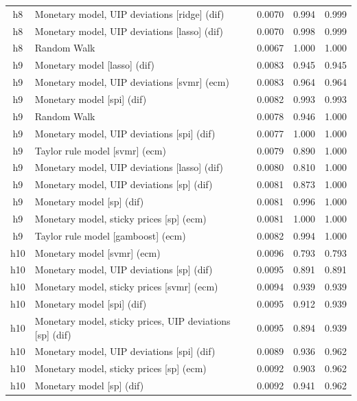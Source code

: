 \begin{ThreePartTable}
\begin{longtable}[t]{cp{5.5cm}ccc}
h8 & \raggedright Monetary model, UIP deviations [ridge] (dif) & 0.0070 & 0.994 & 0.999\\
h8 & \raggedright Monetary model, UIP deviations [lasso] (dif) & 0.0070 & 0.998 & 0.999\\
h8 & \raggedright Random Walk & 0.0067 & 1.000 & 1.000\\
\addlinespace
h9 & \raggedright Monetary model [lasso] (dif) & 0.0083 & 0.945 & 0.945\\
h9 & \raggedright Monetary model, UIP deviations [svmr] (ecm) & 0.0083 & 0.964 & 0.964\\
h9 & \raggedright Monetary model [spi] (dif) & 0.0082 & 0.993 & 0.993\\
h9 & \raggedright Random Walk & 0.0078 & 0.946 & 1.000\\
h9 & \raggedright Monetary model, UIP deviations [spi] (dif) & 0.0077 & 1.000 & 1.000\\
h9 & \raggedright Taylor rule model [svmr] (ecm) & 0.0079 & 0.890 & 1.000\\
h9 & \raggedright Monetary model, UIP deviations [lasso] (dif) & 0.0080 & 0.810 & 1.000\\
h9 & \raggedright Monetary model, UIP deviations [sp] (dif) & 0.0081 & 0.873 & 1.000\\
h9 & \raggedright Monetary model [sp] (dif) & 0.0081 & 0.996 & 1.000\\
h9 & \raggedright Monetary model, sticky prices [sp] (ecm) & 0.0081 & 1.000 & 1.000\\
h9 & \raggedright Taylor rule model [gamboost] (ecm) & 0.0082 & 0.994 & 1.000\\
\addlinespace
h10 & \raggedright Monetary model [svmr] (ecm) & 0.0096 & 0.793 & 0.793\\
h10 & \raggedright Monetary model, UIP deviations [sp] (dif) & 0.0095 & 0.891 & 0.891\\
h10 & \raggedright Monetary model, sticky prices [svmr] (ecm) & 0.0094 & 0.939 & 0.939\\
h10 & \raggedright Monetary model [spi] (dif) & 0.0095 & 0.912 & 0.939\\
h10 & \raggedright Monetary model, sticky prices, UIP deviations [sp] (dif) & 0.0095 & 0.894 & 0.939\\
h10 & \raggedright Monetary model, UIP deviations [spi] (dif) & 0.0089 & 0.936 & 0.962\\
h10 & \raggedright Monetary model, sticky prices [sp] (ecm) & 0.0092 & 0.903 & 0.962\\
h10 & \raggedright Monetary model [sp] (dif) & 0.0092 & 0.941 & 0.962\\

\end{longtable}
\end{ThreePartTable}

